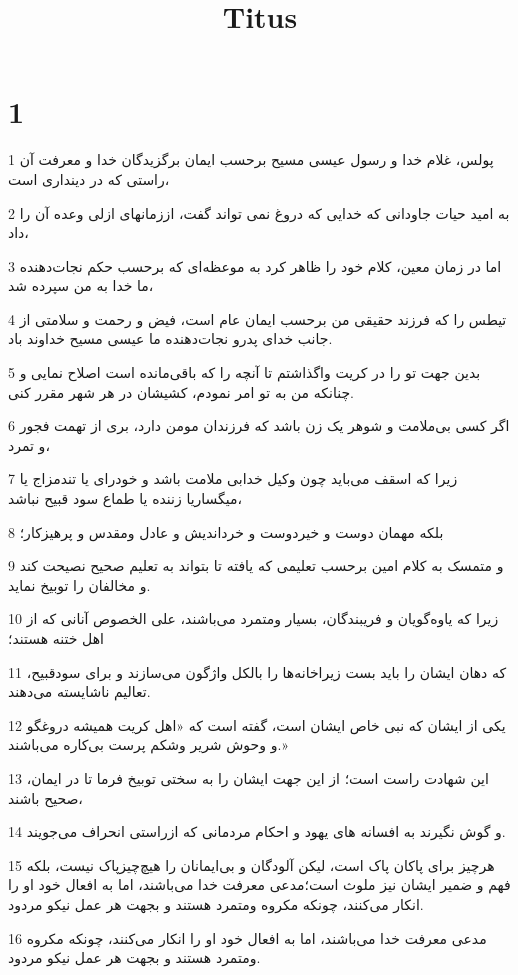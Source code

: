 

\title{Titus}


\chapter{1}

\par 1 پولس، غلام خدا و رسول عیسی مسیح برحسب ایمان برگزیدگان خدا و معرفت آن راستی که در دینداری است،
\par 2 به امید حیات جاودانی که خدایی که دروغ نمی تواند گفت، اززمانهای ازلی وعده آن را داد،
\par 3 اما در زمان معین، کلام خود را ظاهر کرد به موعظه‌ای که برحسب حکم نجات‌دهنده ما خدا به من سپرده شد،
\par 4 تیطس را که فرزند حقیقی من برحسب ایمان عام است، فیض و رحمت و سلامتی از جانب خدای پدرو نجات‌دهنده ما عیسی مسیح خداوند باد.
\par 5 بدین جهت تو را در کریت واگذاشتم تا آنچه را که باقی‌مانده است اصلاح نمایی و چنانکه من به تو امر نمودم، کشیشان در هر شهر مقرر کنی.
\par 6 اگر کسی بی‌ملامت و شوهر یک زن باشد که فرزندان مومن دارد، بری از تهمت فجور و تمرد،
\par 7 زیرا که اسقف می‌باید چون وکیل خدابی ملامت باشد و خودرای یا تندمزاج یا میگساریا زننده یا طماع سود قبیح نباشد،
\par 8 بلکه مهمان دوست و خیردوست و خرداندیش و عادل ومقدس و پرهیزکار؛
\par 9 و متمسک به کلام امین برحسب تعلیمی که یافته تا بتواند به تعلیم صحیح نصیحت کند و مخالفان را توبیخ نماید.
\par 10 زیرا که یاوه‌گویان و فریبندگان، بسیار ومتمرد می‌باشند، علی الخصوص آنانی که از اهل ختنه هستند؛
\par 11 که دهان ایشان را باید بست زیراخانه‌ها را بالکل واژگون می‌سازند و برای سودقبیح، تعالیم ناشایسته می‌دهند.
\par 12 یکی از ایشان که نبی خاص ایشان است، گفته است که «اهل کریت همیشه دروغگو و وحوش شریر وشکم پرست بی‌کاره می‌باشند.»
\par 13 این شهادت راست است؛ از این جهت ایشان را به سختی توبیخ فرما تا در ایمان، صحیح باشند،
\par 14 و گوش نگیرند به افسانه های یهود و احکام مردمانی که ازراستی انحراف می‌جویند.
\par 15 هرچیز برای پاکان پاک است، لیکن آلودگان و بی‌ایمانان را هیچ‌چیزپاک نیست، بلکه فهم و ضمیر ایشان نیز ملوث است؛مدعی معرفت خدا می‌باشند، اما به افعال خود او را انکار می‌کنند، چونکه مکروه ومتمرد هستند و بجهت هر عمل نیکو مردود.
\par 16 مدعی معرفت خدا می‌باشند، اما به افعال خود او را انکار می‌کنند، چونکه مکروه ومتمرد هستند و بجهت هر عمل نیکو مردود.

